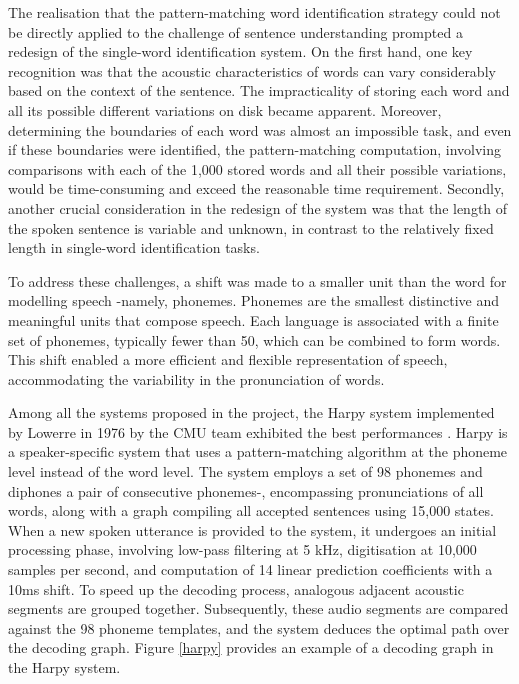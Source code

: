 The realisation that the pattern-matching word identification strategy could not be directly applied to the challenge of sentence understanding prompted a redesign of the single-word identification system. On the first hand, one key recognition was that the acoustic characteristics of words can vary considerably based on the context of the sentence. The impracticality of storing each word and all its possible different variations on disk became apparent. Moreover, determining the boundaries of each word was almost an impossible task, and even if these boundaries were identified, the pattern-matching computation, involving comparisons with each of the 1,000 stored words and all their possible variations, would be time-consuming and exceed the reasonable time requirement. Secondly, another crucial consideration in the redesign of the system was that the length of the spoken sentence is variable and unknown, in contrast to the relatively fixed length in single-word identification tasks.

To address these challenges, a shift was made to a smaller unit than the word for modelling speech -namely, phonemes. Phonemes are the smallest distinctive and meaningful units that compose speech. Each language is associated with a finite set of phonemes, typically fewer than 50, which can be combined to form words. This shift enabled a more efficient and flexible representation of speech, accommodating the variability in the pronunciation of words.

Among all the systems proposed in the project, the Harpy system implemented by Lowerre in 1976 by the \ac{CMU} team exhibited the best performances \cite{klatt1977review}. Harpy is a speaker-specific system that uses a pattern-matching algorithm at the phoneme level instead of the word level. The system employs a set of 98 phonemes and diphones a pair of consecutive phonemes-, encompassing pronunciations of all words, along with a graph compiling all accepted sentences using 15,000 states. When a new spoken utterance is provided to the system, it undergoes an initial processing phase, involving low-pass filtering at 5 k\ac{Hz}, digitisation at 10,000 samples per second, and computation of 14 linear prediction coefficients with a 10ms shift. To speed up the decoding process, analogous adjacent acoustic segments are grouped together. Subsequently, these audio segments are compared against the 98 phoneme templates, and the system deduces the optimal path over the decoding graph. Figure \ref{harpy} provides an example of a decoding graph in the Harpy system.


